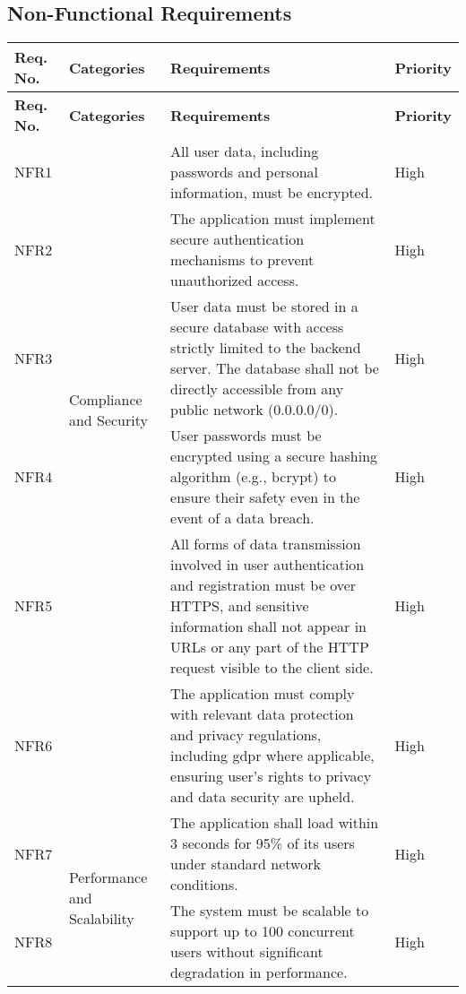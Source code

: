 \subsection{Non-Functional Requirements}
\begin{longtable}{ |m{1.5cm}|m{3.5cm}|m{7cm}|m{1.5cm}| }
    \hline
    \rowcolor{lightgray}
    \textbf{Req. No.} & \textbf{Categories} & \textbf{Requirements} & \textbf{Priority} \\
    \hline
    \endfirsthead

    \hline
    \rowcolor{lightgray}
    \textbf{Req. No.} & \textbf{Categories} & \textbf{Requirements} & \textbf{Priority} \\
    \hline
    \endhead
    NFR1 & \multirow{5}{=}{Compliance and Security} & All user data, including passwords and personal information, must be encrypted. & High \\
    \cline{1-1} \cline{3-4}
    NFR2 &  & The application must implement secure authentication mechanisms to prevent unauthorized access. & High \\
    \cline{1-1} \cline{3-4}
    NFR3 &  & User data must be stored in a secure database with access strictly limited to the backend server. The database shall not be directly accessible from any public network (0.0.0.0/0). & High \\
    \cline{1-1} \cline{3-4}
    NFR4 &  & User passwords must be encrypted using a secure hashing algorithm (e.g., bcrypt) to ensure their safety even in the event of a data breach. & High \\
    \cline{1-1} \cline{3-4}
    NFR5 &  & All forms of data transmission involved in user authentication and registration must be over HTTPS, and sensitive information shall not appear in URLs or any part of the HTTP request visible to the client side. & High \\
    \cline{1-1} \cline{3-4}
    NFR6 &  & The application must comply with relevant data protection and privacy regulations, including \gls{gdpr} where applicable, ensuring user's rights to privacy and data security are upheld. & High \\
    \hline
    NFR7 & \multirow{2}{=}{Performance and Scalability} & The application shall load within 3 seconds for 95\% of its users under standard network conditions. & High \\
    \cline{1-1} \cline{3-4}
    NFR8 &  & The system must be scalable to support up to 100 concurrent users without significant degradation in performance. & High \\

\end{longtable}
